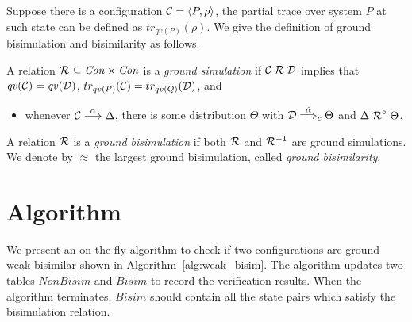 \documentclass[a4paper,runningheads]{llncs}
\newcommand{\lift}[1]{\mathrel{{#1}^\circ}}
\newcommand{\Con}{{\it Con}}
\newcommand{\qv}{{\it qv}}
\newcommand{\CC}{{\cal C}}
\newcommand{\CD}{{\cal D}}
\begin{document}
Suppose there is a configuration $\CC=\langle P,\rho\rangle$, the partial trace over system $P$ at such state can be defined as $tr_{qv(P)}(\rho)$. We give the definition of ground bisimulation and bisimilarity as follows. 
\begin{definition}[\cite{DF12}]
	A relation $\aRel\ \subseteq \Con\times\Con$ is a \emph{ground simulation} if
	$\CC\aRel \CD$ implies that $\qv(\CC)=\qv(\CD)$, $tr_{qv(P)}(\CC)=tr_{qv(Q)}(\CD)$,
	and
	\begin{itemize}
		\item whenever $\CC\ar{\alpha} \Delta$, there is some distribution $\Theta$ with $\CD\dar{\hat{\alpha}}_{c}\Theta$ and $\Delta \lift{\aRel} \Theta$.
	\end{itemize}
	A relation $\mathrel{{\mathcal R }}$ is a \emph{ground bisimulation} if both $\mathrel{{\mathcal R }}$ and
	$\mathrel{{\mathcal R }}^{-1}$ are ground simulations. %
	We denote by $\approx$ the largest ground bisimulation, called \emph{ground bisimilarity}.
\end{definition}

\section{Algorithm}
\label{sec:algorithm}
We present an on-the-fly algorithm to check if two configurations are ground weak bisimilar shown in Algorithm~\ref{alg:weak_bisim}. The algorithm updates two tables $NonBisim$ and $Bisim$ to record the verification results. When the algorithm terminates, $Bisim$ should contain all the state pairs which satisfy the bisimulation relation.
\end{document}
